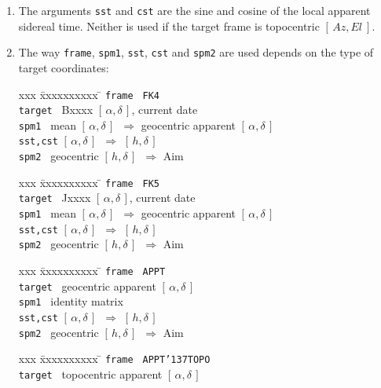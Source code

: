 \documentclass[12pt,fleqn,twoside]{article}
\renewcommand{\_}{{\tt\char'137}}     %
\newcommand{\radec}     {$[\,\alpha,\delta\,]$}
\newcommand{\hadec}     {$[\,h,\delta\,]$}
\newcommand{\azel}      {$[\,Az,El~]$}
\begin{document}
{\begin{enumerate}
      In the present case, the {\sc Aim} vector is calculated, starting
      from the sky target.
\item The arguments {\tt sst} and {\tt cst}
      are the sine and cosine of the local
      apparent sidereal time.  Neither is used if the target frame is
      topocentric \azel.
\item The way {\tt frame}, {\tt spm1}, {\tt sst}, {\tt cst} and
      {\tt spm2} are used depends on the type of target coordinates:
      \begin{tabbing}
         xxx \= xxxxxxxxxx \= \kill
         \> {\tt frame  } \> {\tt FK4} \\
         \> {\tt target } \> Bxxxx \radec, current date \\
         \> {\tt spm1   } \>
                 mean \radec\ $\Rightarrow$ geocentric apparent \radec \\
         \> {\tt sst,cst} \> \radec\ $\Rightarrow$ \hadec \\
         \> {\tt spm2   } \>  geocentric \hadec\ $\Rightarrow$ {\sc Aim}
      \end{tabbing}
      \begin{tabbing}
         xxx \= xxxxxxxxxx \= \kill
         \> {\tt frame  } \> {\tt FK5} \\
         \> {\tt target } \> Jxxxx \radec, current date \\
         \> {\tt spm1   } \>
                 mean \radec\ $\Rightarrow$ geocentric apparent \radec \\
         \> {\tt sst,cst} \> \radec\ $\Rightarrow$ \hadec \\
         \> {\tt spm2   } \> geocentric \hadec\ $\Rightarrow$ {\sc Aim}
      \end{tabbing}
      \begin{tabbing}
         xxx \= xxxxxxxxxx \= \kill
         \> {\tt frame  } \> {\tt APPT} \\
         \> {\tt target } \> geocentric apparent \radec \\
         \> {\tt spm1   } \> identity matrix \\
         \> {\tt sst,cst} \> \radec\ $\Rightarrow$ \hadec \\
         \> {\tt spm2   } \> geocentric \hadec\ $\Rightarrow$ {\sc Aim}
      \end{tabbing}
      \begin{tabbing}
         xxx \= xxxxxxxxxx \= \kill
         \> {\tt frame  } \> {\tt APPT\_TOPO} \\
         \> {\tt target } \> topocentric apparent \radec \\

\end{tabbing}
\end{enumerate}}
\end{document}
